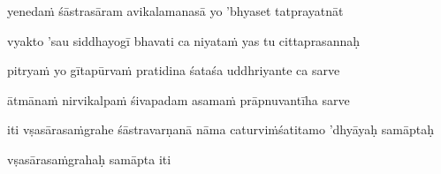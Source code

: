 \ujvers\nemsloka 
yenedaṁ śāstrasāram avikalamanasā yo 'bhyaset tatprayatnāt
\dontdisplaylinenum

\nemslokab 
vyakto 'sau siddhayogī bhavati ca niyataṁ yas tu cittaprasannaḥ \danda\dontdisplaylinenum

\nemslokac 
pitryaṁ yo gītapūrvaṁ pratidina śataśa uddhriyante ca sarve
\dontdisplaylinenum

\nemslokad 
ātmānaṁ nirvikalpaṁ śivapadam asamaṁ prāpnuvantīha sarve \veg\dontdisplaylinenum

\vers


\jump
\begin{center}
\ketdanda iti vṣasārasaṁgrahe śāstravarṇanā nāma caturviṁśatitamo 'dhyāyaḥ samāptaḥ\ketdanda
\end{center}
\dontdisplaylinenum\vers 


\jump
\begin{center}
\ketdanda vṣasārasaṁgrahaḥ samāpta iti\ketdanda
\end{center}
\dontdisplaylinenum\vers 
